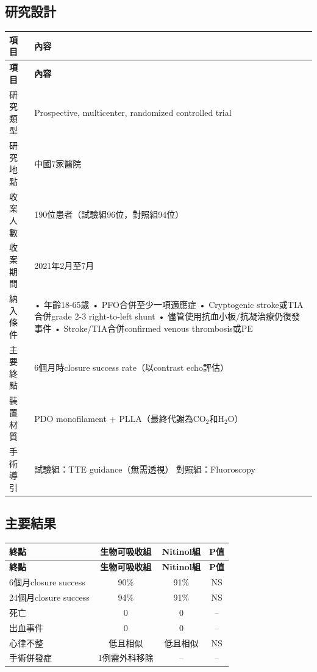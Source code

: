 \documentclass[12pt,a4paper]{article}
\begin{document}
\subsection{研究設計}

\begin{longtable}{p{4cm}p{10cm}}
\toprule
\textbf{項目} & \textbf{內容} \\
\midrule
\endfirsthead
\toprule
\textbf{項目} & \textbf{內容} \\
\midrule
\endhead
\bottomrule
\endfoot

研究類型 & Prospective, multicenter, randomized controlled trial \\
\midrule
研究地點 & 中國7家醫院 \\
\midrule
收案人數 & 190位患者（試驗組96位，對照組94位） \\
\midrule
收案期間 & 2021年2月至7月 \\
\midrule
納入條件 & • 年齡18-65歲\newline
• PFO合併至少一項適應症\newline
• Cryptogenic stroke或TIA合併grade 2-3 right-to-left shunt\newline
• 儘管使用抗血小板/抗凝治療仍復發事件\newline
• Stroke/TIA合併confirmed venous thrombosis或PE \\
\midrule
主要終點 & 6個月時closure success rate（以contrast echo評估） \\
\midrule
裝置材質 & PDO monofilament + PLLA（最終代謝為CO$_2$和H$_2$O） \\
\midrule
手術導引 & 試驗組：TTE guidance（無需透視）\newline
對照組：Fluoroscopy \\
\bottomrule
\end{longtable}

\subsection{主要結果}

\begin{longtable}{p{5cm}ccc}
\toprule
\textbf{終點} & \textbf{生物可吸收組} & \textbf{Nitinol組} & \textbf{P值} \\
\midrule
\endfirsthead
\toprule
\textbf{終點} & \textbf{生物可吸收組} & \textbf{Nitinol組} & \textbf{P值} \\
\midrule
\endhead
\bottomrule
\endfoot

6個月closure success & 90\% & 91\% & NS \\
24個月closure success & 94\% & 91\% & NS \\
死亡 & 0 & 0 & -- \\
出血事件 & 0 & 0 & -- \\
心律不整 & 低且相似 & 低且相似 & NS \\
手術併發症 & 1例需外科移除 & -- & -- \\
\bottomrule
\end{longtable}
\end{document}
